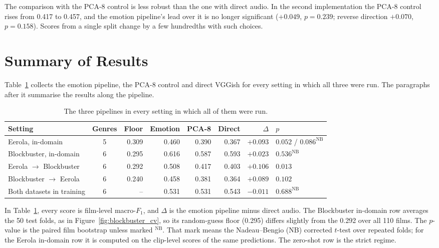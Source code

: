 The comparison with the PCA-8 control is less robust than the one with direct audio. In the
second implementation the PCA-8 control rises from 0.417 to 0.457, and the emotion
pipeline's lead over it is no longer significant ($+0.049$, $p=0.239$; reverse direction
$+0.070$, $p=0.158$). Scores from a single split change by a few hundredths with such choices.

\section{Summary of Results}
\label{sec:eval_summary}

Table~\ref{tab:disc_settings} collects the emotion pipeline, the PCA-8 control and direct
VGGish for every setting in which all three were run. The paragraphs after it summarise the
results along the pipeline.

\begin{table}[H]
  \centering
  \small
  \caption{The three pipelines in every setting in which all of them were run.}
  \label{tab:disc_settings}
  \setlength{\tabcolsep}{4pt}
  \begin{tabular}{lcrrrrrl}
    \toprule
    Setting & Genres & Floor & Emotion & PCA-8 & Direct & $\Delta$ & $p$ \\
    \midrule
    Eerola, in-domain                        & 5 & 0.309 & 0.460 & 0.390 & 0.367 & $+0.093$ & $0.052$ / $0.086^{\mathrm{NB}}$ \\
    Blockbuster, in-domain                   & 6 & 0.295 & 0.616 & 0.587 & 0.593 & $+0.023$ & $0.536^{\mathrm{NB}}$ \\
    Eerola $\rightarrow$ Blockbuster         & 6 & 0.292 & 0.508 & 0.417 & 0.403 & $+0.106$ & $0.013$ \\
    Blockbuster $\rightarrow$ Eerola         & 6 & 0.240 & 0.458 & 0.381 & 0.364 & $+0.089$ & $0.102$ \\
    Both datasets in training                & 6 & --    & 0.531 & 0.531 & 0.543 & $-0.011$ & $0.688^{\mathrm{NB}}$ \\
    \bottomrule
  \end{tabular}
\end{table}

In Table~\ref{tab:disc_settings}, every score is film-level macro-$F_1$, and $\Delta$ is the emotion pipeline minus direct audio. The Blockbuster in-domain row averages the 50 test folds, as in Figure~\ref{fig:blockbuster_cv}, so its random-guess floor (0.295) differs slightly from the 0.292 over all 110 films. The
$p$-value is the paired film bootstrap unless marked $^{\mathrm{NB}}$. That mark means the
Nadeau--Bengio (NB) corrected $t$-test over repeated folds; for the Eerola in-domain row it is
computed on the clip-level scores of the same predictions. The zero-shot row is the strict
regime.

